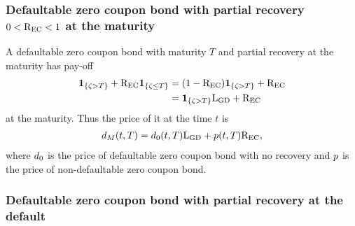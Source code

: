 \subsubsection{Defaultable zero coupon bond with partial recovery $0 < \mathrm{R_{EC}} < 1$ at the maturity}

A defaultable zero coupon bond with maturity $T$ and partial recovery at the maturity has pay-off 
  \begin{align}
    \boldsymbol{1}_{\{\zeta > T\}} + \mathrm{R_{EC}} \boldsymbol{1}_{\{\zeta \leq T\}} &= ( 1 - \mathrm{R_{EC}} ) \boldsymbol{1}_{\{\zeta > T\}} + \mathrm{R_{EC}} \\
    &= \boldsymbol{1}_{\{\zeta > T\}} \mathrm{L_{GD}} + \mathrm{R_{EC}}
  \end{align} 
at the maturity. Thus the price of it at the time $t$ is
  \begin{align}
    d_M(t,T) = d_0(t,T) \mathrm{L_{GD}} +  p(t,T) \mathrm{R_{EC}},
  \end{align}
where $d_0$ is the price of defaultable zero coupon bond with no recovery and $p$ is the price of non-defaultable zero coupon bond.

\subsubsection{Defaultable zero coupon bond with partial recovery at the default}

